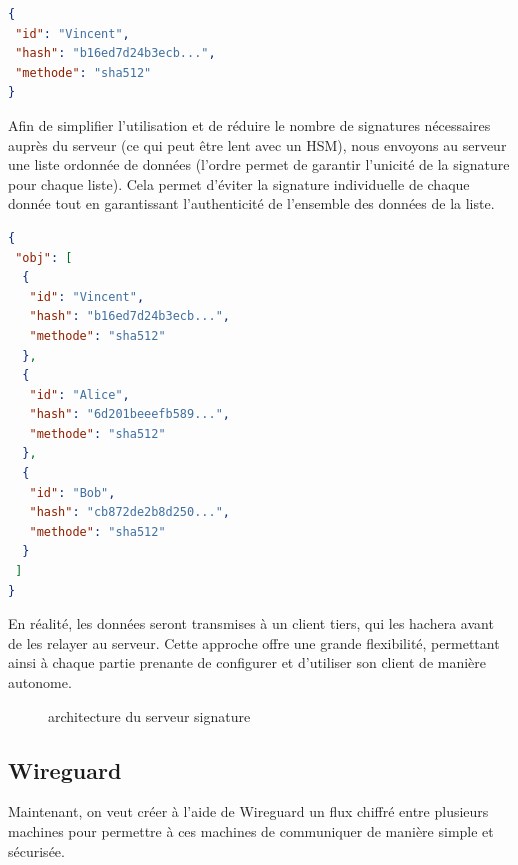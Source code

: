 \documentclass[a4paper, 12pt]{article}
\begin{document}
\begin{center}
\begin{minipage}{.51\linewidth}
\begin{lstlisting}[language = json]
{
 "id": "Vincent",
 "hash": "b16ed7d24b3ecb...",
 "methode": "sha512"
}
\end{lstlisting}
\end{minipage}
\end{center}
Afin de simplifier l'utilisation et de réduire le nombre de signatures nécessaires auprès du serveur (ce qui peut être lent avec un HSM), nous envoyons au serveur une liste ordonnée de données (l'ordre permet de garantir l'unicité de la signature pour chaque liste). Cela permet d'éviter la signature individuelle de chaque donnée tout en garantissant l'authenticité de l'ensemble des données de la liste.
\begin{center}
\begin{minipage}{.51\linewidth}
\begin{lstlisting}[language = json]
{
 "obj": [
  {
   "id": "Vincent",
   "hash": "b16ed7d24b3ecb...",
   "methode": "sha512"
  },
  {
   "id": "Alice",
   "hash": "6d201beeefb589...",
   "methode": "sha512"
  },
  {
   "id": "Bob",
   "hash": "cb872de2b8d250...",
   "methode": "sha512"
  }
 ]
}
\end{lstlisting}
\end{minipage}
\end{center}
En réalité, les données seront transmises à un client tiers, qui les hachera avant de les relayer au serveur. Cette approche offre une grande flexibilité, permettant ainsi à chaque partie prenante de configurer et d'utiliser son client de manière autonome.
\begin{figure}[h]
\centering
{}
\caption{architecture du serveur signature}
\label{shema_serveur_signature}
\end{figure}

\subsection{Wireguard}
Maintenant, on veut créer à l'aide de Wireguard un flux chiffré entre plusieurs machines pour permettre à ces machines de communiquer de manière simple et sécurisée.
\end{document}
